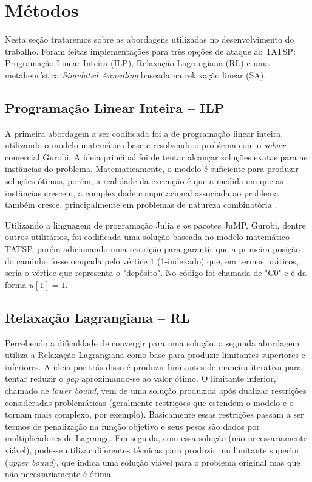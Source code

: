\chapter{Métodos}
\label{chap:methodology}

\noindent Nesta seção trataremos sobre as abordagens utilizadas no desenvolvimento do trabalho. Foram feitas implementações para três opções de ataque ao TATSP: Programação Linear Inteira (ILP), Relaxação Lagrangiana (RL) e uma metaheurística \emph{Simulated Annealing} baseada na relaxação linear (SA).

\section{Programação Linear Inteira -- ILP}
\noindent A primeira abordagem a ser codificada foi a de programação linear inteira, utilizando o modelo matemático base \cite{Carmine2025} e resolvendo o problema com o \emph{solver} comercial Gurobi. A ideia principal foi de tentar alcançar soluções exatas para as instâncias do problema. Matematicamente, o modelo é suficiente para produzir soluções ótimas, porém, a realidade da execução é que a medida em que as instâncias crescem, a complexidade computacional associada ao problema também cresce, principalmente em problemas de natureza combinatória \cite{Wolsey2020}.

Utilizando a linguagem de programação Julia e os pacotes JuMP, Gurobi, dentre outros utilitários, foi codificada uma solução baseada no modelo matemático TATSP, porém adicionando uma restrição para garantir que a primeira posição do caminho fosse ocupada pelo vértice $1$ (1-indexado) que, em termos práticos, seria o vértice que representa o "depósito". No código foi chamada de "C0" e é da forma $u[1] = 1$.

\section{Relaxação Lagrangiana -- RL}
\noindent Percebendo a dificuldade de convergir para uma solução, a segunda abordagem utiliza a Relaxação Lagrangiana como base para produzir limitantes superiores e inferiores. A ideia por trás disso é produzir limitantes de maneira iterativa para tentar reduzir o \emph{gap} aproximando-se ao valor ótimo. O limitante inferior, chamado de \emph{lower bound}, vem de uma solução produzida após dualizar restrições consideradas problemáticas (geralmente restrições que estendem o modelo e o tornam mais complexo, por exemplo). Basicamente essas restrições passam a ser termos de penalização na função objetivo e seus pesos são dados por multiplicadores de Lagrange. Em seguida, com essa solução (não necessariamente viável), pode-se utilizar diferentes técnicas para produzir um limitante superior (\emph{upper bound}), que indica uma solução viável para o problema original mas que não necessariamente é ótima.

